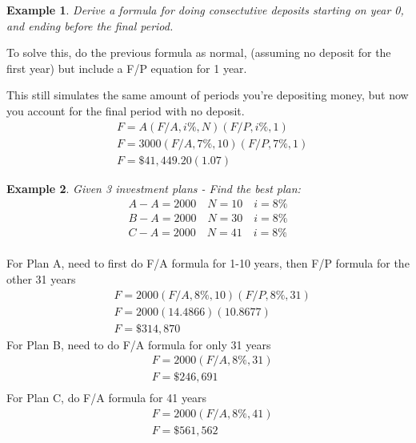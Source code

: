 \documentclass{report} %
\newtheorem{exmp}{Example}
\begin{document}
\begin{exmp}
    Derive a formula for doing consectutive deposits starting on year 0, and ending before the final period.
\end{exmp}
To solve this, do the previous formula as normal, (assuming no deposit for the first year) but include a F/P equation for 1 year.

This still simulates the same amount of periods you're depositing money, but now you account for the final period with no deposit.
\begin{equation*}
    \begin{aligned}
        &F = A(F/A, i\%, N)(F/P, i\%, 1) \\
        &F = 3000(F/A, 7\%, 10)(F/P, 7\%, 1) \\
        &F = \$41,449.20(1.07)
    \end{aligned}
\end{equation*}

\begin{exmp}
    Given 3 investment plans - Find the best plan:
    \begin{align*}
        A - A = 2000 \quad N = 10 \quad i=8\% \\
        B - A = 2000 \quad N = 30 \quad i=8\% \\
        C - A = 2000 \quad N = 41 \quad i=8\% \\
    \end{align*}
\end{exmp}
For Plan A, need to first do F/A formula for 1-10 years, then F/P formula for the other 31 years
\begin{equation*}
    \begin{aligned}
        &F = 2000(F/A, 8\%, 10)(F/P, 8\%, 31) \\
        &F = 2000(14.4866)(10.8677) \\
        &F = \$314,870
    \end{aligned}
\end{equation*}
For Plan B, need to do F/A formula for only 31 years
\begin{equation*}
    \begin{aligned}
        &F = 2000(F/A, 8\%, 31) \\
        &F = \$246,691 \\
    \end{aligned}
\end{equation*}
For Plan C, do F/A formula for 41 years
\begin{equation*}
    \begin{aligned}
        &F = 2000(F/A, 8\%, 41) \\
        &F = \$561,562 \\
    \end{aligned}
\end{equation*}
\end{document}
